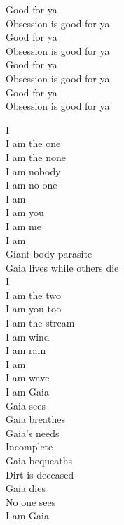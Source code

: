 Good for ya \\
Obsession is good for ya \\
Good for ya \\
Obsession is good for ya \\
Good for ya \\
Obsession is good for ya \\
Good for ya \\
Obsession is good for ya \\




I \\
I am the one \\
I am the none \\
I am nobody \\
I am no one \\
I am  \\
I am you \\
I am me \\
I am  \\

Giant body parasite \\
Gaia lives while others die \\

I \\
I am the two \\
I am you too \\
I am the stream \\
I am wind \\
I am rain \\
I am  \\
I am wave \\
I am Gaia \\

Gaia sees \\
Gaia breathes \\
Gaia's needs \\
Incomplete \\
Gaia bequeaths \\
Dirt is deceased \\
Gaia dies \\
No one sees \\

I am Gaia \\

